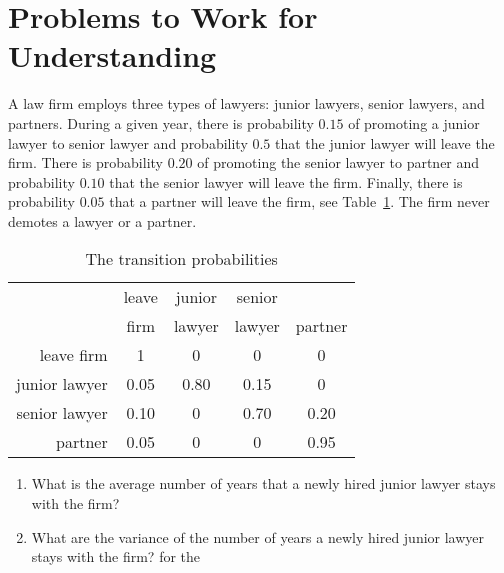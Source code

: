 \documentclass[12pt]{article}
\begin{document}
% 

\hr

\section*{Problems to Work for Understanding}

\renewcommand{\theexerciseseries}{}
\renewcommand{\theexercise}{\arabic{exercise}}

\begin{exercise}
    A law firm employs three types of lawyers:  junior lawyers, senior
    lawyers, and partners.  During a given year, there is probability \(
    0.15 \) of promoting a junior lawyer to senior lawyer and
    probability \( 0.5 \) that the junior lawyer will leave the firm.
    There is probability \( 0.20 \) of promoting the senior lawyer to
    partner and probability \( 0.10 \) that the senior lawyer will leave
    the firm.  Finally, there is probability \( 0.05 \) that a partner
    will leave the firm, see
    Table~\ref{tab:newwaitingtimeabsorption:lawyers}.  
    The firm never demotes a lawyer or a partner.
  
    \begin{table}[htbp]
        \caption[]{The transition probabilities }
        \vspace{4mm}
        \begin{tabular}[tb]
            {r|cccc} & leave & junior & senior & \\
            & firm & lawyer & lawyer & partner \\
            \hline
            leave firm & 1 & 0 & 0 & 0 \\
            junior lawyer & 0.05 & 0.80 & 0.15 & 0 \\
            senior lawyer & 0.10 & 0 & 0.70 & 0.20 \\
            partner & 0.05 & 0 & 0 & 0.95
        \end{tabular}
        \label{tab:newwaitingtimeabsorption:lawyers}
    \end{table}

    \begin{enumerate}
    \item   What is the average number of years that a newly hired junior lawyer
    stays with the firm?
  \item What are the variance of the number of years a newly hired junior lawyer
    stays with the firm?
    for the  

    \end{enumerate}
  \end{exercise}
\end{document}
